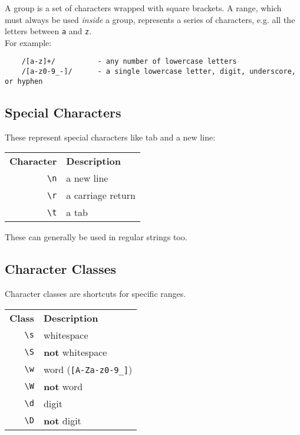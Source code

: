 A group is a set of characters wrapped with square brackets. A range, which must always be used \textit{inside} a group, represents a series of characters, e.g. all the letters between \texttt{a} and \texttt{z}.
\\

For example:

\begin{verbatim}
    /[a-z]+/          - any number of lowercase letters
    /[a-z0-9_-]/      - a single lowercase letter, digit, underscore, or hyphen
\end{verbatim}

\subsection{Special Characters}

These represent special characters like tab and a new line:

\begin{center}
    \begin{small}
        \begin{tabu}{r l}
            \textbf{Character}          & \textbf{Description} \\
            \texttt{\textbackslash n}          & a new line \\
            \texttt{\textbackslash r}          & a carriage return \\
            \texttt{\textbackslash t}          & a tab \\
        \end{tabu}
    \end{small}
\end{center}

These can generally be used in regular strings too.

\subsection{Character Classes}

Character classes are shortcuts for specific ranges.

\begin{center}
    \begin{small}
        \begin{tabu}{r l}
            \textbf{Class}                    & \textbf{Description} \\
            \texttt{\textbackslash s}         & whitespace \\
            \texttt{\textbackslash S}         & \textbf{not} whitespace \\
            \texttt{\textbackslash w}         & word (\texttt{[A-Za-z0-9\_]}) \\
            \texttt{\textbackslash W}         & \textbf{not} word \\
            \texttt{\textbackslash d}         & digit \\
            \texttt{\textbackslash D}         & \textbf{not} digit
        \end{tabu}
    \end{small}
\end{center}

